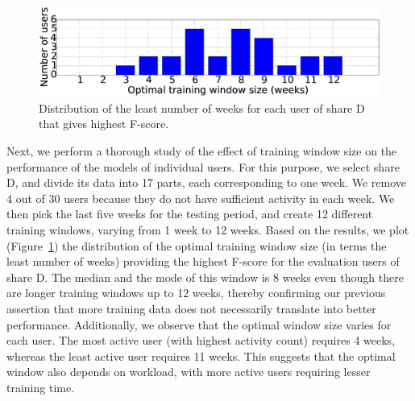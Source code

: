 \begin{figure}[!htbp]
\begin{center}
\centering
\includegraphics[width=0.95\linewidth]{FileAccess/figs/histogram_leastbestweekfscore6216New}
\caption{Distribution of the least number of weeks for each user of share D that gives highest F-score. } 
\label{fig:histBestLeastWeek6216}
\end{center}
\end{figure}

Next, we perform a thorough study of the effect of training window
size on the performance of the models of individual users.  For this
purpose, we select share D, and divide its data into 17
parts, each corresponding to one week.  We remove 4 out of 30 users
because they do not have sufficient activity in each week.  We then
pick the last five weeks for the testing period, and create 12
different training windows, varying from 1 week to 12 weeks.  Based on
the results, we plot (Figure~\ref{fig:histBestLeastWeek6216}) the
distribution of the optimal training window size (in terms the least
number of weeks) providing the highest F-score for the evaluation
users of share D.  The median and the mode of this window is 8
weeks even though there are longer training windows up to 12 weeks,
thereby confirming our previous assertion that more training data does
not necessarily translate into better performance.  Additionally, we observe that
the optimal window size varies for each user.  The most active user
(with highest activity count) requires 4 weeks, whereas the least
active user requires 11 weeks.  This suggests that the optimal window
also depends on workload, with more active users requiring lesser
training time.

